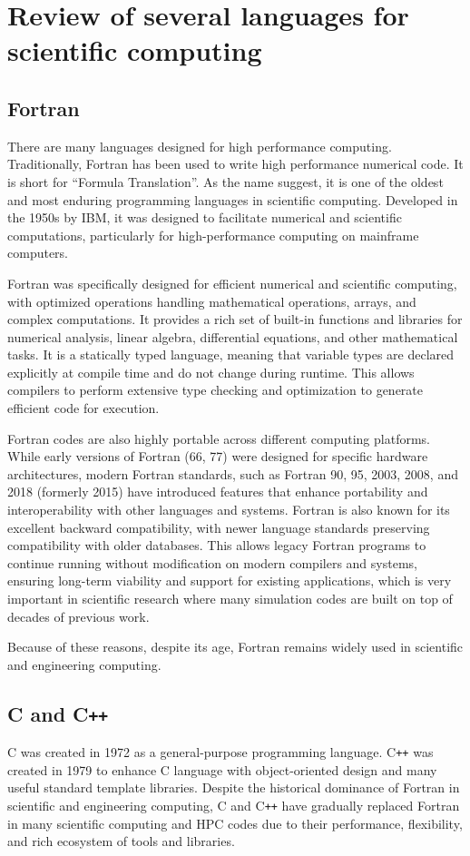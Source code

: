\section{Review of several languages for scientific computing}
\subsection{Fortran}
There are many languages designed for high performance computing.
Traditionally, Fortran has been used to write high performance numerical code.
It is short for ``Formula Translation''. As the name suggest, it is one of the oldest and most enduring programming languages in scientific computing.
Developed in the 1950s by IBM, it was designed to facilitate numerical and scientific computations, particularly for high-performance computing on mainframe computers.

Fortran was specifically designed for efficient numerical and scientific computing, with optimized operations handling mathematical operations, arrays, and complex computations.
It provides a rich set of built-in functions and libraries for numerical analysis, linear algebra, differential equations, and other mathematical tasks.
It is a statically typed language, meaning that variable types are declared explicitly at compile time and do not change during runtime. This allows compilers to perform extensive type checking and optimization to generate efficient code for execution.

Fortran codes are also highly portable across different computing platforms. While early versions of Fortran (66, 77) were designed for specific hardware architectures, modern Fortran standards, such as Fortran 90, 95, 2003, 2008, and 2018 (formerly 2015) have introduced features that enhance portability and interoperability with other languages and systems. Fortran is also known for its excellent backward compatibility, with newer language standards preserving compatibility with older databases.
This allows legacy Fortran programs to continue running without modification on modern compilers and systems, ensuring long-term viability and support for existing applications, which is very important in scientific research where many simulation codes are built on top of decades of previous work.

Because of these reasons, despite its age, Fortran remains widely used in scientific and engineering computing.

\subsection{C and C\texttt{++}}
C was created in 1972 as a general-purpose programming language. C\texttt{++} was created in 1979 to enhance C language with object-oriented design and many useful standard template libraries.
Despite the historical dominance of Fortran in scientific and engineering computing, C and C\texttt{++} have gradually replaced Fortran in many scientific computing and HPC codes due to their performance, flexibility, and rich ecosystem of tools and libraries.


